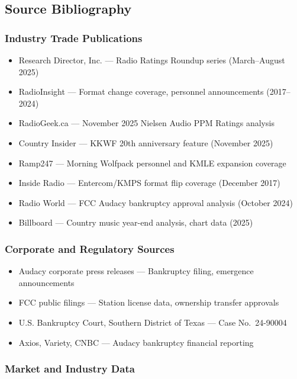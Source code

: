 \documentclass[11pt,letterpaper]{article}
\begin{document}
\subsection{Source Bibliography}

\subsubsection*{Industry Trade Publications}

\begin{itemize}[leftmargin=2em]
\item Research Director, Inc. --- Radio Ratings Roundup series (March--August 2025)
\item RadioInsight --- Format change coverage, personnel announcements (2017--2024)
\item RadioGeek.ca --- November 2025 Nielsen Audio PPM Ratings analysis
\item Country Insider --- KKWF 20th anniversary feature (November 2025)
\item Ramp247 --- Morning Wolfpack personnel and KMLE expansion coverage
\item Inside Radio --- Entercom/KMPS format flip coverage (December 2017)
\item Radio World --- FCC Audacy bankruptcy approval analysis (October 2024)
\item Billboard --- Country music year-end analysis, chart data (2025)
\end{itemize}

\subsubsection*{Corporate and Regulatory Sources}

\begin{itemize}[leftmargin=2em]
\item Audacy corporate press releases --- Bankruptcy filing, emergence announcements
\item FCC public filings --- Station license data, ownership transfer approvals
\item U.S. Bankruptcy Court, Southern District of Texas --- Case No.~24-90004
\item Axios, Variety, CNBC --- Audacy bankruptcy financial reporting
\end{itemize}

\subsubsection*{Market and Industry Data}
\end{document}
